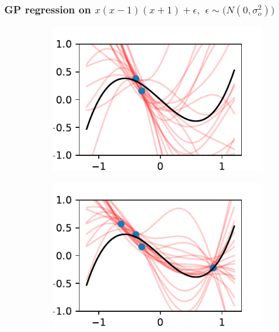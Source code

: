 \documentclass{beamer}
\begin{document}
\begin{frame}
    \frametitle{GP regression on $x(x-1)(x+1) + \epsilon,$ $\epsilon \sim \mathcal(N(0, \sigma^2_o))$}
    \begin{figure}
        \centering
        \begin{subfigure}[t]{0.4\textwidth}
            \centering
            \includegraphics[width=\textwidth]{cub_GP_err_2_iters.pdf}
        \end{subfigure}%
        \begin{subfigure}[t]{0.4\textwidth}
            \centering
            \includegraphics[width=\textwidth]{cub_GP_err_4_iters.pdf}
        \end{subfigure}
        \begin{subfigure}[t]{0.4\textwidth}
            \centering

\end{subfigure}
\end{figure}
\end{frame}
\end{document}
